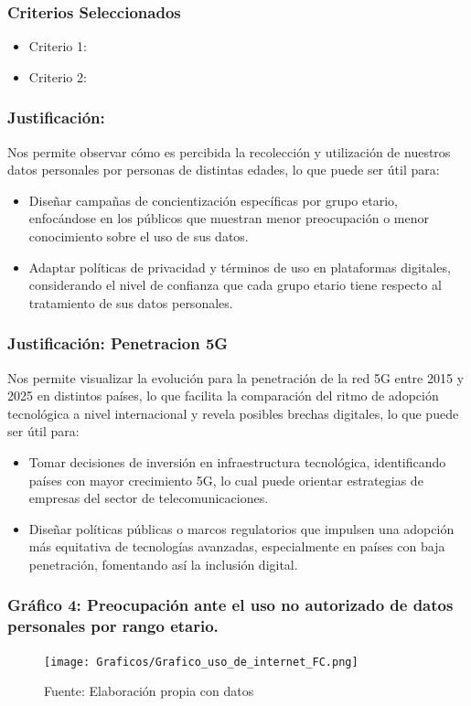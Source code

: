 \documentclass[12pt, a4paper]{article}
\begin{document}
\subsubsection*{Criterios Seleccionados}
\begin{itemize}
    \item Criterio 1: 
    \item Criterio 2: 
\end{itemize}

\subsubsection*{Justificación:}
Nos permite observar cómo es percibida la recolección y utilización de nuestros datos personales por personas de distintas edades, lo que puede ser útil para:

\begin{itemize}
    \item Diseñar campañas de concientización específicas por grupo etario, enfocándose en los públicos que muestran menor preocupación o menor conocimiento sobre el uso de sus datos.
    \item Adaptar políticas de privacidad y términos de uso en plataformas digitales, considerando el nivel de confianza que cada grupo etario tiene respecto al tratamiento de sus datos personales.
\end{itemize}

\subsubsection*{Justificación: Penetracion 5G}
Nos permite visualizar la evolución para la penetración de la red 5G entre 2015 y 2025 en distintos países, lo que facilita la comparación del ritmo de adopción tecnológica a nivel internacional y revela posibles brechas digitales, lo que puede ser útil para:
\begin{itemize}
    \item Tomar decisiones de inversión en infraestructura tecnológica, identificando países con mayor crecimiento 5G, lo cual puede orientar estrategias de empresas del sector de telecomunicaciones.
    \item Diseñar políticas públicas o marcos regulatorios que impulsen una adopción más equitativa de tecnologías avanzadas, especialmente en países con baja penetración, fomentando así la inclusión digital.
\end{itemize}

\subsubsection*{Gráfico 4: Preocupación ante el uso no autorizado de datos personales por rango etario.}
\begin{figure}[H]
    \centering
    \texttt{[image: Graficos/Grafico\_uso\_de\_internet\_FC.png]}
    \caption[5]{Fuente: Elaboración propia con datos}
\end{figure}
\end{document}
